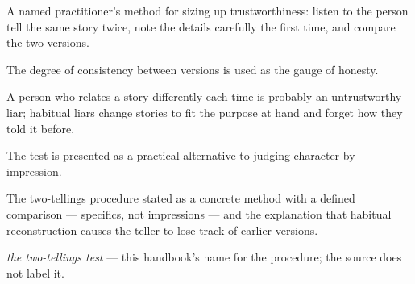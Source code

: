 

\begin{distilled}
  \item A named practitioner's method for sizing up trustworthiness: listen to the person tell the same story twice, note the details carefully the first time, and compare the two versions.
  \item The degree of consistency between versions is used as the gauge of honesty.
  \item A person who relates a story differently each time is probably an untrustworthy liar; habitual liars change stories to fit the purpose at hand and forget how they told it before.
  \item The test is presented as a practical alternative to judging character by impression.
\end{distilled}

\begin{unique}
  \item The two-tellings procedure stated as a concrete method with a defined comparison --- specifics, not impressions --- and the explanation that habitual reconstruction causes the teller to lose track of earlier versions.
\end{unique}

\begin{terms}
  \item \emph{the two-tellings test} --- this handbook's name for the procedure; the source does not label it.
\end{terms}

